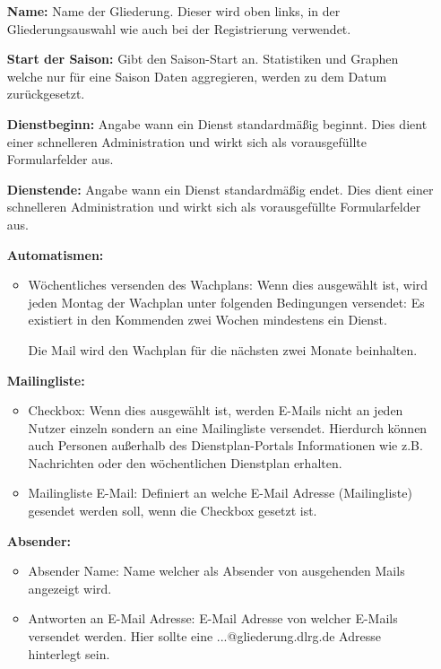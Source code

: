 \begin{itemize}
	\item[\textbf{Name:}] Name der Gliederung. Dieser wird oben links, in der Gliederungsauswahl wie auch bei der Registrierung verwendet.
	\item[\textbf{Start der Saison:}] Gibt den Saison-Start an. Statistiken und Graphen welche nur für eine Saison Daten aggregieren, werden zu dem Datum zurückgesetzt.
	\item[\textbf{Dienstbeginn:}] Angabe wann ein Dienst standardmäßig beginnt. Dies dient einer schnelleren Administration und wirkt sich als vorausgefüllte Formularfelder aus.
	\item[\textbf{Dienstende:}] Angabe wann ein Dienst standardmäßig endet. Dies dient einer schnelleren Administration und wirkt sich als vorausgefüllte Formularfelder aus.
	\item[\textbf{Automatismen:}]
	\begin{itemize}
		\item Wöchentliches versenden des Wachplans: Wenn dies ausgewählt ist, wird jeden Montag der Wachplan unter folgenden Bedingungen versendet: Es existiert in den Kommenden zwei Wochen mindestens ein Dienst. 
		
		\noindent Die Mail wird den Wachplan für die nächsten zwei Monate beinhalten.
	\end{itemize}
	\item[\textbf{Mailingliste:}]
	\begin{itemize}
		\item Checkbox: Wenn dies ausgewählt ist, werden E-Mails nicht an jeden Nutzer einzeln sondern an eine Mailingliste versendet. Hierdurch können auch Personen außerhalb des Dienstplan-Portals Informationen wie z.B. Nachrichten oder den wöchentlichen Dienstplan erhalten.
		\item Mailingliste E-Mail: Definiert an welche E-Mail Adresse (Mailingliste) gesendet werden soll, wenn die Checkbox gesetzt ist.
	\end{itemize}
	\item[\textbf{Absender:}]
	\begin{itemize}
		\item Absender Name: Name welcher als Absender von ausgehenden Mails angezeigt wird.
		\item Antworten an E-Mail Adresse: E-Mail Adresse von welcher E-Mails versendet werden. Hier sollte eine ...@gliederung.dlrg.de Adresse hinterlegt sein.
	\end{itemize}
\end{itemize}

